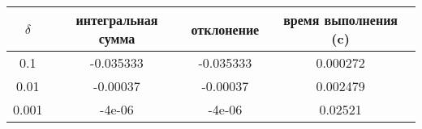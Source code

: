 \begin{tabular}{|c|c|c|c|}
    \hline
    $\delta$ & интегральная сумма & отклонение & время выполнения (c)\\
    \hline
    0.1 & -0.035333 & -0.035333 & 0.000272\\
    \hline
    0.01 & -0.00037 & -0.00037 & 0.002479\\
    \hline
    0.001 & -4e-06 & -4e-06 & 0.02521\\
    \hline
\end{tabular}
